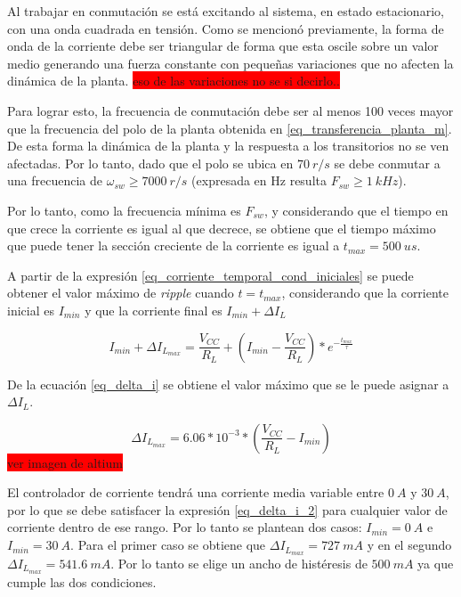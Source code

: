 Al trabajar en conmutación se está excitando al sistema, en estado estacionario, con una onda cuadrada en tensión. Como se mencionó previamente, la forma de onda de la corriente debe ser triangular de forma que esta oscile sobre un valor medio generando una fuerza constante con pequeñas variaciones que no afecten la dinámica de la planta.
\colorbox{red}{eso de las variaciones no se si decirlo..}

Para lograr esto, la frecuencia de conmutación debe ser al menos 100 veces mayor que la frecuencia del polo de la planta obtenida en \ref{eq_transferencia_planta_m}.
De esta forma la dinámica de la planta y la respuesta a los transitorios no se ven afectadas.  Por lo tanto, dado que el polo se ubica en $70\:r/s$  se debe conmutar a una frecuencia de $\omega_{sw}\geq7000\:r/s$ (expresada en Hz resulta $F_{sw}\geq1\:kHz$).

Por lo tanto, como la frecuencia mínima es $F_{sw}$, y considerando que el tiempo en que crece la corriente es igual al que decrece, se obtiene que el tiempo máximo que puede tener la sección creciente de la corriente es igual a $t_{max}=500\:us$. 

A partir de la expresión \ref{eq_corriente_temporal_cond_iniciales} se puede obtener el valor máximo de \textsl{ripple} cuando $t=t_{max}$, considerando que la corriente inicial es $I_{min}$ y que la corriente final es $I_{min}+\Delta I_L$

\begin{equation} \label{eq_delta_i}
	I_{min}+\Delta I_{L_{max}}=\frac{V_{CC}}{R_L}+(I_{min}-\frac{V_{CC}}{R_L})*e^{-\frac{t_{max}}{\tau}}
\end{equation}

De la ecuación \ref{eq_delta_i} se obtiene el valor máximo que se le puede asignar a $\Delta I_L$. 

\begin{equation} \label{eq_delta_i_2}
	\Delta I_{L_{max}}=6.06*10^{-3}*(\frac{V_{CC}}{R_L}-I_{min})
\end{equation}
\colorbox{red}{ver imagen de altium}

El controlador de corriente tendrá una corriente media variable entre $0\:A$ y $30\:A$, por lo que se debe satisfacer la expresión \ref{eq_delta_i_2} para cualquier valor de corriente dentro de ese rango. Por lo tanto se plantean dos casos: $I_{min}=0\:A$ e $I_{min}=30\:A$. Para el primer caso se obtiene que $\Delta I_{L_{max}}=727\:mA$ y en el segundo $\Delta I_{L_{max}}=541.6\:mA$. Por lo tanto se elige un ancho de histéresis de $500\:mA$ ya que cumple las dos condiciones.

